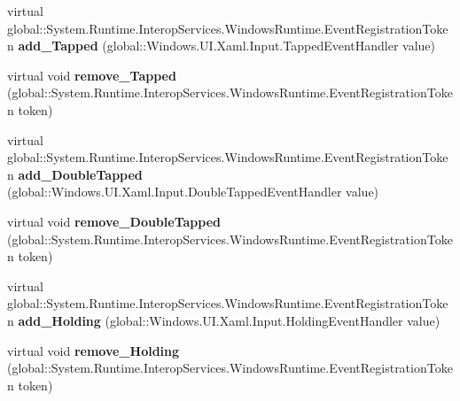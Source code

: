 \begin{DoxyCompactItemize}
\mbox{\label{class_windows_1_1_u_i_1_1_xaml_1_1_u_i_element_a424707fb793f3cb0d3d9c1a1d642c7e1}} 
virtual global\+::\+System.\+Runtime.\+Interop\+Services.\+Windows\+Runtime.\+Event\+Registration\+Token {\bfseries add\+\_\+\+Tapped} (global\+::\+Windows.\+U\+I.\+Xaml.\+Input.\+Tapped\+Event\+Handler value)
\item 
\mbox{\label{class_windows_1_1_u_i_1_1_xaml_1_1_u_i_element_a2e2bb189943aceb74962211a295014c7}} 
virtual void {\bfseries remove\+\_\+\+Tapped} (global\+::\+System.\+Runtime.\+Interop\+Services.\+Windows\+Runtime.\+Event\+Registration\+Token token)
\item 
\mbox{\label{class_windows_1_1_u_i_1_1_xaml_1_1_u_i_element_a5dae62e559d69ce1b422ccd06618f671}} 
virtual global\+::\+System.\+Runtime.\+Interop\+Services.\+Windows\+Runtime.\+Event\+Registration\+Token {\bfseries add\+\_\+\+Double\+Tapped} (global\+::\+Windows.\+U\+I.\+Xaml.\+Input.\+Double\+Tapped\+Event\+Handler value)
\item 
\mbox{\label{class_windows_1_1_u_i_1_1_xaml_1_1_u_i_element_a943e8ea205e8d92b950867b58c4406d7}} 
virtual void {\bfseries remove\+\_\+\+Double\+Tapped} (global\+::\+System.\+Runtime.\+Interop\+Services.\+Windows\+Runtime.\+Event\+Registration\+Token token)
\item 
\mbox{\label{class_windows_1_1_u_i_1_1_xaml_1_1_u_i_element_a4bbe62d6b5ea9aa8d3c4d53f196cc796}} 
virtual global\+::\+System.\+Runtime.\+Interop\+Services.\+Windows\+Runtime.\+Event\+Registration\+Token {\bfseries add\+\_\+\+Holding} (global\+::\+Windows.\+U\+I.\+Xaml.\+Input.\+Holding\+Event\+Handler value)
\item 
\mbox{\label{class_windows_1_1_u_i_1_1_xaml_1_1_u_i_element_a1cb283d7dedbabf394dd0cd9a384d808}} 
virtual void {\bfseries remove\+\_\+\+Holding} (global\+::\+System.\+Runtime.\+Interop\+Services.\+Windows\+Runtime.\+Event\+Registration\+Token token)
\item 
\mbox{\label{class_windows_1_1_u_i_1_1_xaml_1_1_u_i_element_a2013f410a096b8dec9f149c57069520c}} 

\end{DoxyCompactItemize}
